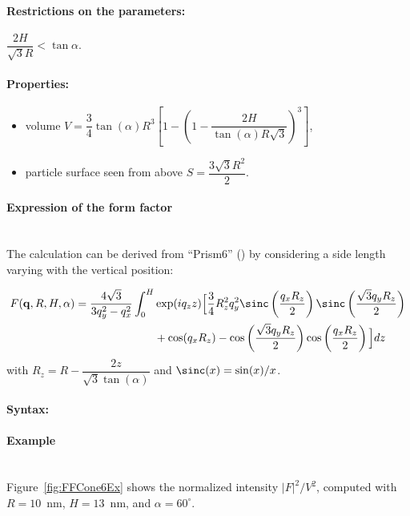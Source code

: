 \paragraph{Restrictions on the parameters:} 
$\dfrac{2H}{\sqrt{3}R}< \tan{\alpha}$.

\paragraph{Properties:}
\begin{itemize}
\item volume $V = \dfrac{3}{4} \tan(\alpha) R^3 \left[
            1 - \left(1- \dfrac{2H}{ \tan(\alpha) R\sqrt{3}}\right)^3
            \right]$,
\item  particle surface seen from above $S =\dfrac{3\sqrt{3}R^2}{2}$.
\end{itemize}

\paragraph{Expression of the form factor}\mbox{}\\
The
calculation can be derived from ``Prism6'' () by
considering a side length varying with the vertical position:

\begin{align*}
F(\mathbf{q}, R, H, \alpha) = \frac{4\sqrt{3}}{3q_y ^2 - q_x^2}\int_0 ^H &\exp(iq_z z)
\Big[\frac{3}{4}R_z^2q_y^2 \sinc\left(\frac{q_xR_z}{2}\right)\sinc\left(\frac{\sqrt{3}q_y
R_z}{2}\right)\\
&+\cos(q_xR_z)-\cos\left(\frac{\sqrt{3}q_y R_z}{2}\right)\cos\left(\frac{q_xR_z}{2}\right) \Big]dz
\end{align*}
with $R_z=R-\dfrac{2z}{\sqrt{3}\tan(\alpha)}$ and $\sinc(x)=\sin(x)/x$.

\paragraph{Syntax:}  

\paragraph{Example}\mbox{}\\
Figure~\ref{fig:FFCone6Ex} shows the normalized intensity
$|F|^2/V^2$, computed with $R=10$~nm, $H=13$~nm, and
$\alpha=60^{\circ}$.

